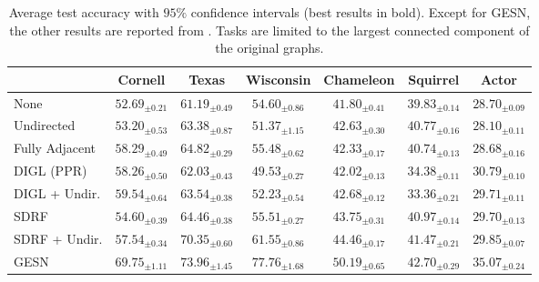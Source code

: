 \documentclass[final,5p,times,twocolumn]{elsarticle}
\begin{document}
\begin{table*}
	\centering
	\begin{tabular}{lcccccc}
		\toprule
		& \textbf{Cornell} & \textbf{Texas} & \textbf{Wisconsin} & \textbf{Chameleon} & \textbf{Squirrel} & \textbf{Actor} \\
		\midrule
		None & $52.69_{\pm 0.21}$ & $61.19_{\pm 0.49}$ & $54.60_{\pm 0.86}$ & $41.80_{\pm 0.41}$ & $39.83_{\pm 0.14}$ & $28.70_{\pm 0.09}$ \\
		Undirected & $53.20_{\pm 0.53}$ & $63.38_{\pm 0.87}$ & $51.37_{\pm 1.15}$ & $42.63_{\pm 0.30}$ & $40.77_{\pm 0.16}$ & $28.10_{\pm 0.11}$ \\
		Fully Adjacent & $58.29_{\pm 0.49}$ & $64.82_{\pm 0.29}$ & $55.48_{\pm 0.62}$ & $42.33_{\pm 0.17}$ & $40.74_{\pm 0.13}$ & $28.68_{\pm 0.16}$ \\
		\midrule
		DIGL (PPR) & $58.26_{\pm 0.50}$ & $62.03_{\pm 0.43}$ & $49.53_{\pm 0.27}$ & $42.02_{\pm 0.13}$ & $34.38_{\pm 0.11}$ & $30.79_{\pm 0.10}$ \\
		DIGL + Undir. & $59.54_{\pm 0.64}$ & $63.54_{\pm 0.38}$ & $52.23_{\pm 0.54}$ & $42.68_{\pm 0.12}$ & $33.36_{\pm 0.21}$ & $29.71_{\pm 0.11}$ \\
		\midrule
		SDRF & $54.60_{\pm 0.39}$ & $64.46_{\pm 0.38}$ & $55.51_{\pm 0.27}$ & $43.75_{\pm 0.31}$ & $40.97_{\pm 0.14}$ & $29.70_{\pm 0.13}$ \\
		SDRF + Undir. & $57.54_{\pm 0.34}$ & $70.35_{\pm 0.60}$ & $61.55_{\pm 0.86}$ & $44.46_{\pm 0.17}$ & $41.47_{\pm 0.21}$ & $29.85_{\pm 0.07}$ \\
		\midrule
		GESN & $\mathbf{69.75}_{\pm 1.11}$ & $\mathbf{73.96}_{\pm 1.45}$ & $\mathbf{77.76}_{\pm 1.68}$ & $\mathbf{50.19}_{\pm 0.65}$ & $\mathbf{42.70}_{\pm 0.29}$ & $\mathbf{35.07}_{\pm 0.24}$ \\
		\bottomrule
	\end{tabular}
\caption{Average test accuracy with $95\%$ confidence intervals (best results in bold). Except for GESN, the other results are reported from \cite{Topping2022}. Tasks are limited to the largest connected component of the original graphs.}
\label{tab:experiments-rewiring}
\end{table*}
\end{document}
